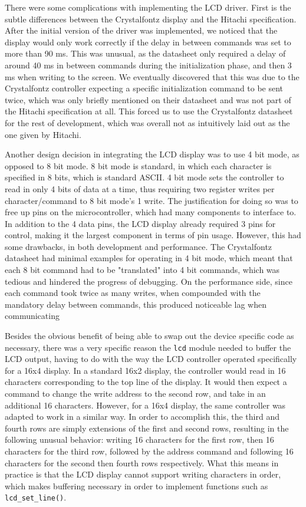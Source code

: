 \documentclass[journal,compsoc]{IEEEtran}
\begin{document}
There were some complications with implementing the LCD driver. First is the subtle differences between the Crystalfontz display and the Hitachi specification. After the initial version of the driver was implemented, we noticed that the display would only work correctly if the delay in between commands was set to more than 90 ms. This was unusual, as the datasheet only required a delay of around 40 ms in between commands during the initialization phase, and then 3 ms when writing to the screen. We eventually discovered that this was due to the Crystalfontz controller expecting a specific initialization command to be sent twice, which was only briefly mentioned on their datasheet and was not part of the Hitachi specification at all. This forced us to use the Crystalfontz datasheet for the rest of development, which was overall not as intuitively laid out as the one given by Hitachi. 

Another design decision in integrating the LCD display was to use 4 bit mode, as opposed to 8 bit mode. 8 bit mode is standard, in which each character is specified in 8 bits, which is standard ASCII. 4 bit mode sets the controller to read in only 4 bits of data at a time, thus requiring two register writes per character/command to 8 bit mode's 1 write. The justification for doing so was to free up pins on the microcontroller, which had many components to interface to. In addition to the 4 data pins, the LCD display already required 3 pins for control, making it the largest component in terms of pin usage. However, this had some drawbacks, in both development and performance. The Crystalfontz datasheet had minimal examples for operating in 4 bit mode, which meant that each 8 bit command had to be "translated" into 4 bit commands, which was tedious and hindered the progress of debugging. On the performance side, since each command took twice as many writes, when compounded with the mandatory delay between commands, this produced noticeable lag when communicating 

Besides the obvious benefit of being able to swap out the device specific code as necessary, there was a very specific reason the \lstinline[columns=fixed]{lcd} module needed to buffer the LCD output, having to do with the way the LCD controller operated specifically for a 16x4 display. In a standard 16x2 display, the controller would read in 16 characters corresponding to the top line of the display. It would then expect a command to change the write address to the second row, and take in an additional 16 characters. However, for a 16x4 display, the same controller was adapted to work in a similar way. In order to accomplish this, the third and fourth rows are simply extensions of the first and second rows, resulting in the following unusual behavior: writing 16 characters for the first row, then 16 characters for the third row, followed by the address command and following 16 characters for the second then fourth rows respectively. What this means in practice is that the LCD display cannot support writing characters in order, which makes buffering necessary in order to implement functions such as \lstinline[columns=fixed]{lcd_set_line()}.
\end{document}
